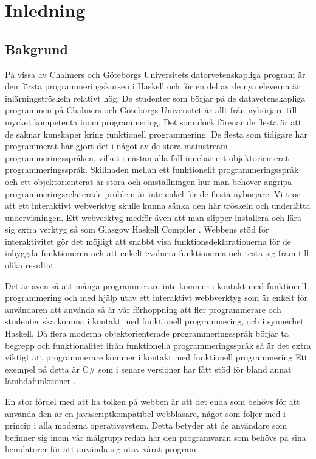 ﻿\section{Inledning}

\subsection{Bakgrund}
På vissa av Chalmers och Göteborgs Universitets datorvetenskapliga program är den första programmeringskursen i Haskell \citep{haskell98} och för en del av de nya eleverna är inlärningströskeln relativt hög. De studenter som börjar på de datavetenskapliga programmen på Chalmers och Göteborgs Universitet är allt från nybörjare till mycket kompetenta inom programmering. Det som dock förenar de flesta är att de saknar kunskaper kring funktionell programmering. De flesta som tidigare har programmerat har gjort det i något av de stora mainstream-programmeringsspråken, vilket i nästan alla fall innebär ett objektorienterat programmeringsspråk. Skillnaden mellan ett funktionellt programmeringsspråk och ett objektorienterat är stora och omställningen hur man behöver angripa programmeringsrelaterade problem är inte enkel för de flesta nybörjare. Vi tror att ett interaktivt webverktyg skulle kunna sänka den här tröskeln och underlätta undervisningen. Ett webverktyg medför även att man slipper installera och lära sig extra verktyg så som Glasgow Haskell Compiler \citep{ghc}. Webbens stöd för interaktivitet gör det möjligt att snabbt visa funktionsdeklarationerna för de inbyggda funktionerna och att enkelt evaluera funktionerna och testa sig fram till olika resultat.

Det är även så att många programmerare inte kommer i kontakt med funktionell programmering  och med hjälp utav ett interaktivt webbverktyg som är enkelt för användaren att använda så är vår förhoppning att fler programmerare och studenter ska komma i kontakt med funktionell programmering, och i synnerhet Haskell. Då flera moderna objektorienterade programmeringsspråk börjar ta begrepp och funktionalitet ifrån funktionella programmeringsspråk så är det extra viktigt att programmerare kommer i kontakt med funktionell programmering Ett exempel på detta är C\# som i senare versioner har fått stöd för bland annat lambdafunktioner \citep{csharp}. 

En stor fördel med att ha tolken på webben är att det enda som behövs för att använda den är en javascriptkompatibel webbläsare, något som följer med i princip i alla moderna operativsystem. Detta betyder att de användare som befinner sig inom vår målgrupp redan har den programvaran som behövs på sina hemdatorer för att använda sig utav vårat program.

